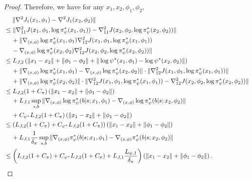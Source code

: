 \documentclass{article}
\theoremstyle{plain}
\theoremstyle{definition}
\theoremstyle{remark}
\begin{document}
\begin{proof}
    Therefore, we have for any $x_1,x_2,\phi_1,\phi_2$,
    \begin{align}
        & \quad \; \| \nabla^2 J_1(x_1,\phi_1)  - \nabla^2 J_1(x_2,\phi_2) \| \notag \\
        & \leq \| \nabla^2_{11} J(x_1,\phi_1,\log \pi_\psi^*(x_1,\phi_1)) - \nabla^2_{11} J(x_2,\phi_2,\log \pi_\psi^*(x_2,\phi_2)) \| \notag\\
        & \quad \, + \| \nabla_{(x,\phi)} \log \pi_\psi^*(x_1,\phi_1)\nabla^2_{12} J(x_1,\phi_1,\log \pi_\psi^*(x_1,\phi_1)) \notag\\
        & \quad \, - \nabla_{(x,\phi)} \log \pi_\psi^*(x_2,\phi_2)\nabla^2_{12} J(x_2,\phi_2,\log \pi_\psi^*(x_2,\phi_2)) \| \notag \\
        & \leq L_{J,2} \left( \| x_1 - x_2 \| + \| \phi_1 - \phi_2\| + \| \log \psi^*(x_1,\phi_1) - \log \psi^*(x_2,\phi_2)\| \right) \notag\\
        & \quad \, + \| \nabla_{(x,\phi)} \log \pi_\psi^*(x_1,\phi_1) - \nabla_{(x,\phi)} \log \pi_\psi^*(x_2,\phi_2) \| \cdot \| \nabla^2_{12} J(x_1,\phi_1,\log \pi_\psi^*(x_1,\phi_1)) \|\notag \\
        & \quad \, + \| \nabla_{(x,\phi)} \log \pi_\psi^*(x_2,\phi_2) \| \cdot \| \nabla^2_{12} J(x_1,\phi_1,\log \pi_\psi^*(x_1,\phi_1)) - \nabla^2_{12} J(x_2,\phi_2,\log \pi_\psi^*(x_2,\phi_2)) \| \notag \\
        & \leq L_{J,2} (1 + C_{\pi}) \left( \| x_1 - x_2 \| + \|\phi_1 - \phi_2\| \right) \notag \\
        & \quad \, +  L_{J,1} \sup_{s,b} \| \nabla_{(x,\phi)} \log \pi_\psi^*(b|s;x_1,\phi_1) - \nabla_{(x,\phi)} \log \pi_\psi^*(b|s;x_2,\phi_2) \| \notag\\
        & \quad \, + C_{\psi^*} L_{J,2} (1 + C_{\pi}) \left( \| x_1 - x_2 \| + \| \phi_1 - \phi_2\| \right) \notag \\
        & \leq \left( L_{J,2} (1 + C_{\pi}) + C_{\psi^*} L_{J,2} (1 + C_{\pi}) \right) \left( \| x_1 - x_2 \| + \|\phi_1 - \phi_2\| \right) \notag\\
        & \quad \, +  L_{J,1} \frac{1}{\delta_\pi} \sup_{s,b} \| \nabla_{(x,\phi)} \pi_\psi^*(b|s;x_1,\phi_1) - \nabla_{(x,\phi)} \pi_\psi^*(b|s;x_2,\phi_2) \| \notag \\
        & \leq \left( L_{J,2} (1 + C_{\pi}) + C_{\psi^*} L_{J,2} (1 + C_{\pi}) +  L_{J,1} \frac{L_{\psi,1}}{\delta_\pi} \right) \left( \| x_1 - x_2 \| + \| \phi_1 - \phi_2 \| \right).
    \end{align}


\end{proof}
\end{document}
